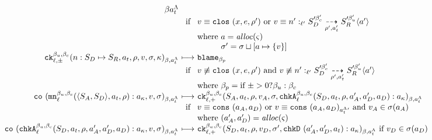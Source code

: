 \documentclass[preprint,onecolumn,9pt]{sigplanconf} %
\begin{document}
\begin{figure*}
\begin{gather*}
\begin{array}{@{}r@{\ }c@{\ }l@{}}
         {\msmlab}{\mstimeline} \\
      &\text{ if }& \mval \equiv \clos{\mvar, \mexp, \menv'}
       \text{ or }  \mval \equiv \blclos{\mname'}{\mmlab_u'}{\mmlab_c'}{\mlab'}{\mscon_D'}{\mscon_R'}{\menv'}{\mtimeline'}{\maddr'} \\
      &&\text{where } \maddr = \alloc(\mstate) \\
      &&\phantom{\text{where }} \msto' = \ext{\msto}{\maddr}{\setof{\mval}}
      \\
      \ck{\mmlab_u}{\mmlab_c}{\mlab}{\mvariance}
         {\sarr{\mname}{\mscon_D}{\mscon_R}, \mtimeline, \menv, \mval, \msto, \mkont}
         {\msmlab}{\mstimeline} &\machstep&
      \sblame{\mmlab_p} \\
      &\text{ if }& \mval \nequiv \clos{\mvar, \mexp, \menv'}
       \text{ and } \mval \nequiv \blclos{\mname'}{\mmlab_u'}{\mmlab_c'}{\mlab'}{\mscon_D'}{\mscon_R'}{\menv'}{\mtimeline'}{\maddr'} \\
      &&\text{where } \mmlab_p = \varianceite{\mvariance}{\mmlab_u}{\mmlab_c}
      \\
      \co{\spush{\kmon{\mmlab_u}{\mmlab_c}{\mlab}{\sconsc{\mscon_A}{\mscon_D}, \mtimeline, \menv}}{\mkaddr},
          \mval,
          \msto}
         {\msmlab}{\mstimeline} &\machstep&
      \ck{\mmlab_u}{\mmlab_c}{\mlab}{+}
         {\mscon_A,
          \mtimeline,
          \menv,
          \mval_A,
          \msto,
          \spush{\kchkA[^{\mmlab_u, \mmlab_c}_\mlab]{\mscon_D, \mtimeline, \menv, \maddr'_A, \maddr'_D, \maddr_D}}
                {\mkaddr}}
         {\msmlab}{\mstimeline} \\
      &\text{ if }& \mval \equiv \vcons{\maddr_A}{\maddr_D} \text{ or }
                    \mval \equiv \vconst{\maddr_A}{\maddr_D}{\mstimeline'} \text{ and } \mval_A \in \msto(\maddr_A) \\
      &&\text{where } (\maddr'_A, \maddr'_D) = \alloc(\mstate)
      \\
      \co{\spush{\kchkA[^{\mmlab_u, \mmlab_c}_\mlab]{\mscon_D, \mtimeline, \menv, \maddr'_A, \maddr'_D, \maddr_D}}{\mkaddr},
          \mval, \msto}
         {\msmlab}{\mstimeline} &\machstep&
      \ck{\mmlab_u}{\mmlab_c}{\mlab}{+}
         {\mscon_D, \mtimeline, \menv, \mval_D, \msto',
                                \spush{\kchkD{\maddr'_A, \maddr'_D, \mtimeline}}{\mkaddr}}
         {\msmlab}{\mstimeline}
      \text{ if } \mval_D \in \msto(\maddr_D) \\

\end{array}
\end{gather*}
\end{figure*}
\end{document}
